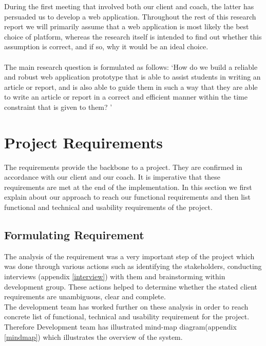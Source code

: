During the first meeting that involved both our client and coach, the latter has persuaded us to develop a web application. Throughout the rest of this research report we will primarily assume that a web application is most likely the best choice of platform, whereas the research itself is intended to find out whether this assumption is correct, and if so, why it would be an ideal choice. \\\\

The main research question is formulated as follows: `How do we build a reliable and robust web application prototype that is able to assist students in writing an article or report, and is also able to guide them in such a way that they are able to write an article or report in a correct and efficient manner within the time constraint that is given to them? '

\section{Project Requirements}

The requirements provide the backbone to a project. They are confirmed in accordance with our client and our coach. It is imperative that these requirements are met at the end of the implementation. In this section we first explain about our approach to reach our functional requirements and then list functional and technical and usability requirements of the project.

\subsection{Formulating Requirement} %
\label{sub:subsection_name}
The analysis of the requirement was a very important step of the project which was done through various actions such as identifying the stakeholders, conducting interviews (appendix \ref{interview}) with them and brainstorming within development group. These actions helped to determine whether the stated client requirements are unambiguous, clear and complete. \\
The development team has worked further on these analysis in order to  reach concrete list of functional, technical and usability requirement for the project. Therefore Development team has illustrated mind-map diagram(appendix \ref{mindmap}) which illustrates the overview of the system.


